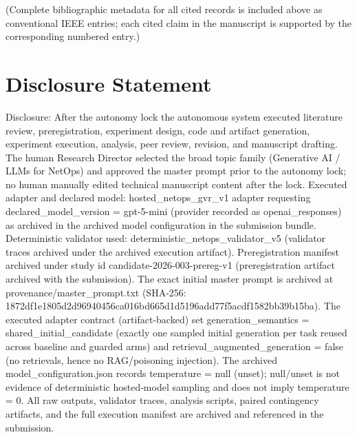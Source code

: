 \documentclass[conference]{IEEEtran}
\begin{document}
(Complete bibliographic metadata for all cited records is included above as conventional IEEE entries; each cited claim in the manuscript is supported by the corresponding numbered entry.)

\section*{Disclosure Statement}
Disclosure: After the autonomy lock the autonomous system executed literature review, preregistration, experiment design, code and artifact generation, experiment execution, analysis, peer review, revision, and manuscript drafting. The human Research Director selected the broad topic family (Generative AI / LLMs for NetOps) and approved the master prompt prior to the autonomy lock; no human manually edited technical manuscript content after the lock. Executed adapter and declared model: hosted\_netops\_gvr\_v1 adapter requesting declared\_model\_version = gpt-5-mini (provider recorded as openai\_responses) as archived in the archived model configuration in the submission bundle. Deterministic validator used: deterministic\_netops\_validator\_v5 (validator traces archived under the archived execution artifact). Preregistration manifest archived under study id candidate-2026-003-prereg-v1 (preregistration artifact archived with the submission). The exact initial master prompt is archived at provenance/master\_prompt.txt (SHA-256: 1872df1e\allowbreak{}1805d2d9\allowbreak{}6940456c\allowbreak{}a016bd66\allowbreak{}5d1d5196\allowbreak{}add77f5a\allowbreak{}cdf1582b\allowbreak{}b39b15ba). The executed adapter contract (artifact-backed) set generation\_semantics = shared\_initial\_candidate (exactly one sampled initial generation per task reused across baseline and guarded arms) and retrieval\_augmented\_generation = false (no retrievals, hence no RAG/poisoning injection). The archived model\_configuration.json records temperature = null (unset); null/unset is not evidence of deterministic hosted‑model sampling and does not imply temperature = 0. All raw outputs, validator traces, analysis scripts, paired contingency artifacts, and the full execution manifest are archived and referenced in the submission.
\end{document}
